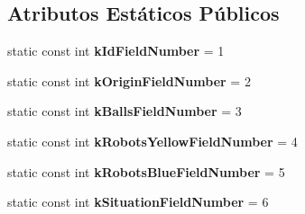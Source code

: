 \subsection*{Atributos Estáticos Públicos}
\begin{DoxyCompactItemize}
\item 
static const int {\bfseries k\+Id\+Field\+Number} = 1\hypertarget{classvss__state_1_1Global__State_adc3acf2d9111dd7e0e442b1c8f8743ab}{}\label{classvss__state_1_1Global__State_adc3acf2d9111dd7e0e442b1c8f8743ab}

\item 
static const int {\bfseries k\+Origin\+Field\+Number} = 2\hypertarget{classvss__state_1_1Global__State_a124e80222f404a8607d383c6b626b98a}{}\label{classvss__state_1_1Global__State_a124e80222f404a8607d383c6b626b98a}

\item 
static const int {\bfseries k\+Balls\+Field\+Number} = 3\hypertarget{classvss__state_1_1Global__State_a7ccc5ad24ae6460151ee94fd5f3800f5}{}\label{classvss__state_1_1Global__State_a7ccc5ad24ae6460151ee94fd5f3800f5}

\item 
static const int {\bfseries k\+Robots\+Yellow\+Field\+Number} = 4\hypertarget{classvss__state_1_1Global__State_a3dbd17117a81ad417c69ca945668edaa}{}\label{classvss__state_1_1Global__State_a3dbd17117a81ad417c69ca945668edaa}

\item 
static const int {\bfseries k\+Robots\+Blue\+Field\+Number} = 5\hypertarget{classvss__state_1_1Global__State_a69fd6df3aa2671364cb92838e3824e81}{}\label{classvss__state_1_1Global__State_a69fd6df3aa2671364cb92838e3824e81}

\item 
static const int {\bfseries k\+Situation\+Field\+Number} = 6\hypertarget{classvss__state_1_1Global__State_a2d5cf9ac7fcb6fd41d98c14ce50ff2ac}{}\label{classvss__state_1_1Global__State_a2d5cf9ac7fcb6fd41d98c14ce50ff2ac}

\end{DoxyCompactItemize}
